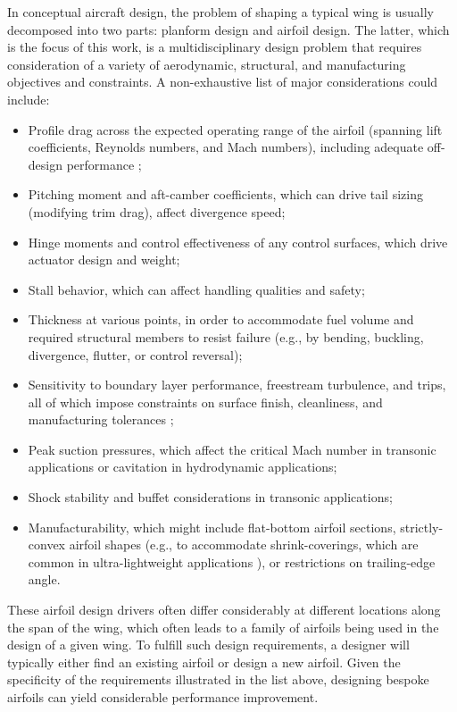 \documentclass[journal]{new-aiaa}
\begin{document}
In conceptual aircraft design, the problem of shaping a typical wing is usually decomposed into two parts: planform design and airfoil design. The latter, which is the focus of this work, is a multidisciplinary design problem that requires consideration of a variety of aerodynamic, structural, and manufacturing objectives and constraints. A non-exhaustive list of major considerations could include:
\begin{itemize}
    \item Profile drag across the expected operating range of the airfoil (spanning lift coefficients, Reynolds numbers, and Mach numbers), including adequate off-design performance \cite{drelaProsConsAirfoil1998};
    \item Pitching moment and aft-camber coefficients, which can drive tail sizing (modifying trim drag), affect divergence speed;
    \item Hinge moments and control effectiveness of any control surfaces, which drive actuator design and weight;
    \item Stall behavior, which can affect handling qualities and safety;
    \item Thickness at various points, in order to accommodate fuel volume and required structural members to resist failure (e.g., by bending, buckling, divergence, flutter, or control reversal);\cite{sharpeTaileronsAeroelasticStability2023}
    \item Sensitivity to boundary layer performance, freestream turbulence, and trips, all of which impose constraints on surface finish, cleanliness, and manufacturing tolerances \cite{eleshaky1993airfoil, seligHighLiftLowReynolds1997, liebeck1973class};
    \item Peak suction pressures, which affect the critical Mach number in transonic applications or cavitation in hydrodynamic applications;
    \item Shock stability and buffet considerations in transonic applications;
    \item Manufacturability, which might include flat-bottom airfoil sections, strictly-convex airfoil shapes (e.g., to accommodate shrink-coverings, which are common in ultra-lightweight applications \cite{drelaLowReynoldsnumberAirfoilDesign1988}), or restrictions on trailing-edge angle.
\end{itemize}

These airfoil design drivers often differ considerably at different locations along the span of the wing, which often leads to a family of airfoils being used in the design of a given wing. To fulfill such design requirements, a designer will typically either find an existing airfoil or design a new airfoil. Given the specificity of the requirements illustrated in the list above, designing bespoke airfoils can yield considerable performance improvement.
\end{document}
